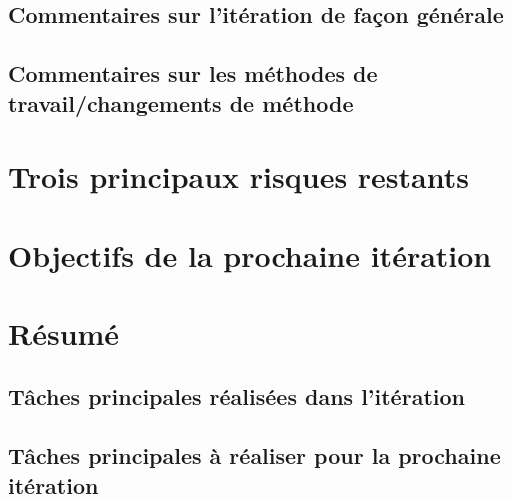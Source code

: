 \documentclass[12pt,titlepage,french]{article}
\begin{document}
\subsection{Commentaires sur l'itération de façon générale}

\subsection{Commentaires sur les méthodes de travail/changements de méthode}


\section{Trois principaux risques restants}


\section{Objectifs de la prochaine itération}

\section{Résumé}

\subsection{Tâches principales réalisées dans l'itération}

\subsection{Tâches principales à réaliser pour la prochaine itération}
\end{document}
